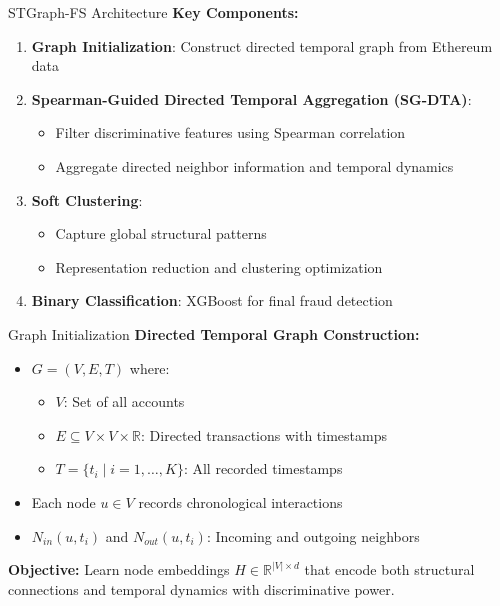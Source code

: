 \documentclass{beamer}
\begin{document}
\begin{frame}{STGraph-FS Architecture}
    \textbf{Key Components:}
    \begin{enumerate}
        \item \textbf{Graph Initialization}: Construct directed temporal graph from Ethereum data
        \item \textbf{Spearman-Guided Directed Temporal Aggregation (SG-DTA)}:
        \begin{itemize}
            \item Filter discriminative features using Spearman correlation
            \item Aggregate directed neighbor information and temporal dynamics
        \end{itemize}
        \item \textbf{Soft Clustering}: 
        \begin{itemize}
            \item Capture global structural patterns
            \item Representation reduction and clustering optimization
        \end{itemize}
        \item \textbf{Binary Classification}: XGBoost for final fraud detection
    \end{enumerate}
\end{frame}

\begin{frame}{Graph Initialization}
    \textbf{Directed Temporal Graph Construction:}
    \begin{itemize}
        \item $G = (V, E, T)$ where:
        \begin{itemize}
            \item $V$: Set of all accounts
            \item $E \subseteq V \times V \times \mathbb{R}$: Directed transactions with timestamps
            \item $T = \{t_i \mid i = 1, \dots, K\}$: All recorded timestamps
        \end{itemize}
        \item Each node $u \in V$ records chronological interactions
        \item $N_{in}(u, t_i)$ and $N_{out}(u, t_i)$: Incoming and outgoing neighbors
    \end{itemize}
    
    \vspace{0.5cm}
    \textbf{Objective:}
    Learn node embeddings $H \in \mathbb{R}^{|V| \times d}$ that encode both structural connections and temporal dynamics with discriminative power.
\end{frame}
\end{document}
